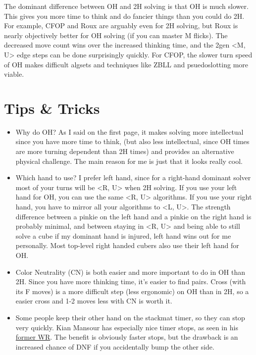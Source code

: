 \documentclass[11pt, oneside]{article}
\begin{document}
The dominant difference between OH and 2H solving is that OH is much slower.
This gives you more time to think and do fancier things than you could do 2H.
For example, CFOP and Roux are arguably even for 2H solving, but Roux is nearly
objectively better for OH solving (if you can master M flicks).
The decreased move count wins over the increased thinking time, and the 2gen
<M, U> edge steps can be done surprisingly quickly.
For CFOP, the slower turn speed of OH makes difficult algsets and techniques
like ZBLL and psuedoslotting more viable.

\section{Tips \& Tricks}
\begin{itemize}
  \item Why do OH? As I said on the first page, it makes solving more
    intellectual since you have more time to think,
    (but also less intellectual, since OH times are more turning
    dependent than 2H times) and provides an alternative physical challenge.
    The main reason for me is just that it looks really cool.
  \item Which hand to use? I prefer left hand, since for a right-hand dominant
    solver most of your turns will be <R, U> when 2H solving. If you use your
    left hand for OH, you can use the same <R, U> algorithms. If you use your
    right hand, you have to mirror all your algorithms to <L, U>.
    The strength difference between a pinkie on the left hand and a pinkie
    on the right hand is probably minimal, and between staying in <R, U>
    and being able to still solve a cube if my dominant hand is injured,
    left hand wins out for me personally. Most top-level right handed cubers
    also use their left hand for OH.
  \item Color Neutrality (CN) is both easier and more important to do in OH
    than 2H. Since you have more thinking time, it's easier to find pairs.
    Cross (with its F moves) is a more difficult step (less ergonomic) on OH
    than in 2H, so a easier cross and 1-2 moves less with CN is worth it.
  \item Some people keep their other hand on the stackmat timer, so they can 
    stop very quickly. Kian Mansour has especially nice timer stops, as seen
    in his \href{https://www.youtube.com/watch?v=pCfLsh5vDt0}{former WR}.
    The benefit is obviously faster stops, but the drawback is an increased
    chance of DNF if you accidentally bump the other side.

\end{itemize}
\end{document}
